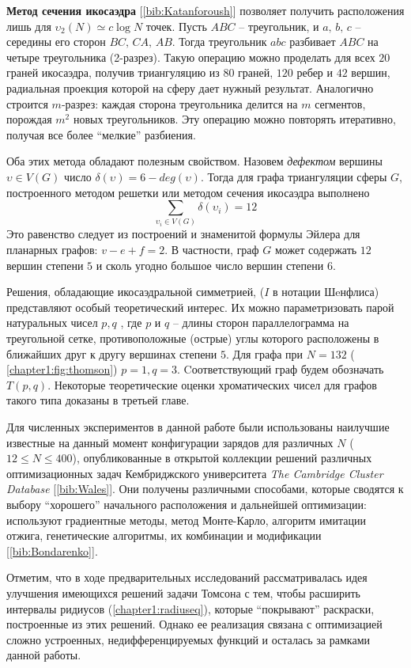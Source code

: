 \textbf{Метод сечения икосаэдра} [\ref{bib:Katanforoush}] позволяет получить расположения лишь 
для $\upsilon_2(N) \simeq c\log{}N$ точек. 
Пусть $ABC$ -- треугольник, и $a,\,b,\,c$ -- середины его сторон $BC,\,CA,\,AB$. 
Тогда треугольник $abc$ разбивает $ABC$ на четыре треугольника (2-разрез). 
Такую операцию можно проделать для всех $20$ граней икосаэдра, 
получив триангуляцию из $80$ граней, $120$ ребер и $42$ вершин, радиальная проекция которой на сферу дает нужный результат. 
Аналогично строится $m$-разрез: каждая сторона треугольника делится на $m$ сегментов, порождая $m^2$ новых треугольников.
Эту операцию можно повторять итеративно, получая все более \enquote{мелкие} разбиения. 

Оба этих метода обладают полезным свойством. Назовем \textit{дефектом} вершины $\upsilon \in V(G)$ 
число $\delta(\upsilon) = 6 - deg(\upsilon)$. 
Тогда для графа триангуляции сферы $G$, построенного методом решетки или методом сечения икосаэдра выполнено 
\begin{equation}\label{chapter1:eq:defect}
\sum\limits_{\upsilon_i \in V(G)} \delta(\upsilon_i) = 12
\end{equation}
Это равенство следует из построений и знаменитой формулы Эйлера для планарных графов: 
$v - e + f = 2$.
В частности, граф $G$ может содержать $12$ вершин степени $5$ и сколь угодно большое число вершин степени $6$. 

Решения, обладающие икосаэдральной симметрией, ($I$ в нотации Шeнфлиса) представляют особый теоретический интерес.
Их можно параметризовать парой натуральных чисел $p,q$ , где $p$ и $q$ -- длины сторон параллелограмма на треугольной сетке, 
противоположные (острые) углы которого расположены в ближайших друг к другу вершинах степени $5$. 
Для графа при $N=132$ (\figurename{ \ref{chapter1:fig:thomson}}) $p=1,q=3$.
Cоответствующий граф будем обозначать $T(p,q)$. 
Некоторые теоретические оценки хроматических чисел для графов такого типа доказаны в третьей главе.

Для численных экспериментов в данной работе были использованы наилучшие 
известные на данный момент конфигурации зарядов для различных $N$ ($12 \le N \le 400$), опубликованные 
в открытой коллекции решений различных оптимизационных задач Кембриджского университета
\textit{The Cambridge Cluster Database} [\ref{bib:Wales}]. 
Они получены различными способами, которые сводятся к выбору \enquote{хорошего} начального расположения
и дальнейшей оптимизации: 
используют градиентные методы, метод Монте-Карло, алгоритм имитации отжига, 
генетические алгоритмы, их комбинации и модификации [\ref{bib:Bondarenko}].

Отметим, что в ходе предварительных исследований рассматривалась идея улучшения имеющихся решений задачи Томсона
с тем, чтобы расширить интервалы ридиусов (\ref{chapter1:radiuseq}), которые \enquote{покрывают} раскраски, 
построенные из этих решений. Однако ее реализация связана с оптимизацией сложно устроенных, 
недифференцируемых функций и осталась за рамками данной работы.
